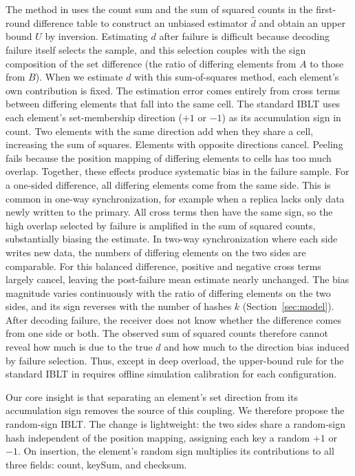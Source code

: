 The method in \cite{wu2026selfsizing} uses the count sum and the sum of squared counts in the first-round difference table to construct an unbiased estimator $\widehat d$ and obtain an upper bound $U$ by inversion. Estimating $d$ after failure is difficult because decoding failure itself selects the sample, and this selection couples with the sign composition of the set difference (the ratio of differing elements from $A$ to those from $B$). When we estimate $d$ with this sum-of-squares method, each element's own contribution is fixed. The estimation error comes entirely from cross terms between differing elements that fall into the same cell. The standard IBLT uses each element's set-membership direction ($+1$ or $-1$) as its accumulation sign in count. Two elements with the same direction add when they share a cell, increasing the sum of squares. Elements with opposite directions cancel. Peeling fails because the position mapping of differing elements to cells has too much overlap. Together, these effects produce systematic bias in the failure sample. For a one-sided difference, all differing elements come from the same side. This is common in one-way synchronization, for example when a replica lacks only data newly written to the primary. All cross terms then have the same sign, so the high overlap selected by failure is amplified in the sum of squared counts, substantially biasing the estimate. In two-way synchronization where each side writes new data, the numbers of differing elements on the two sides are comparable. For this balanced difference, positive and negative cross terms largely cancel, leaving the post-failure mean estimate nearly unchanged. The bias magnitude varies continuously with the ratio of differing elements on the two sides, and its sign reverses with the number of hashes $k$ (Section~\ref{sec:model}). After decoding failure, the receiver does not know whether the difference comes from one side or both. The observed sum of squared counts therefore cannot reveal how much is due to the true $d$ and how much to the direction bias induced by failure selection. Thus, except in deep overload, the upper-bound rule for the standard IBLT in \cite{wu2026selfsizing} requires offline simulation calibration for each configuration.

Our core insight is that separating an element's set direction from its accumulation sign removes the source of this coupling. We therefore propose the random-sign IBLT. The change is lightweight: the two sides share a random-sign hash independent of the position mapping, assigning each key a random $+1$ or $-1$. On insertion, the element's random sign multiplies its contributions to all three fields: count, keySum, and checksum.

